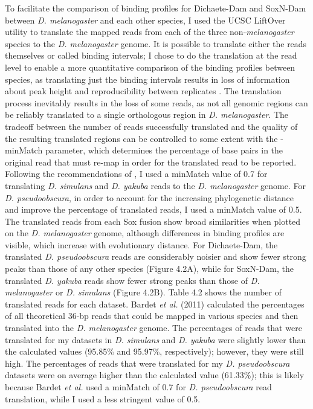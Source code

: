 To facilitate the comparison of binding profiles for Dichaete-Dam and SoxN-Dam between \emph{D. melanogaster} and each other species, I used the UCSC LiftOver utility to translate the mapped reads from each of the three non-\emph{melanogaster} species to the \emph{D. melanogaster} genome. It is possible to translate either the reads themselves or called binding intervals; I chose to do the translation at the read level to enable a more quantitative comparison of the binding profiles between species, as translating just the binding intervals results in loss of information about peak height and reproducibility between replicates \citep{bardet_computational_2011}. The translation process inevitably results in the loss of some reads, as not all genomic regions can be reliably translated to a single orthologous region in \emph{D. melanogaster}. The tradeoff between the number of reads successfully translated and the quality of the resulting translated regions can be controlled to some extent with the -minMatch parameter, which determines the percentage of base pairs in the original read that must re-map in order for the translated read to be reported. Following the recommendations of \citet{bardet_computational_2011}, I used a minMatch value of 0.7 for translating \emph{D. simulans} and \emph{D. yakuba} reads to the \emph{D. melanogaster} genome. For \emph{D. pseudoobscura}, in order to account for the increasing phylogenetic distance and improve the percentage of translated reads, I used a minMatch value of 0.5.\\

The translated reads from each Sox fusion show broad similarities when plotted on the \emph{D. melanogaster} genome, although differences in binding profiles are visible, which increase with evolutionary distance. For Dichaete-Dam, the translated \emph{D. pseudoobscura} reads are considerably noisier and show fewer strong peaks than those of any other species (Figure 4.2A), while for SoxN-Dam, the translated \emph{D. yakuba} reads show fewer strong peaks than those of \emph{D. melanogaster} or \emph{D. simulans} (Figure 4.2B). Table 4.2 shows the number of translated reads for each dataset. Bardet \emph{et al.} (2011) calculated the percentages of all theoretical 36-bp reads that could be mapped in various species and then translated into the \emph{D. melanogaster} genome. The percentages of reads that were translated for my datasets in \emph{D. simulans} and \emph{D. yakuba} were slightly lower than the calculated values (95.85\% and 95.97\%, respectively); however, they were still high. The percentages of reads that were translated for my \emph{D. pseudoobscura} datasets were on average higher than the calculated value (61.33\%); this is likely because Bardet \emph{et al.} used a minMatch of 0.7 for \emph{D. pseudoobscura} read translation, while I used a less stringent value of 0.5.\\

